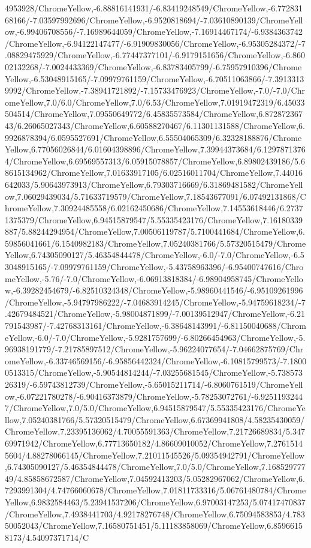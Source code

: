 {\begin{tikzternal}
{4953928/ChromeYellow,-6.88816141931/-6.83419248549/ChromeYellow,-6.77283168166/-7.03597992696/ChromeYellow,-6.9520818694/-7.03610890139/ChromeYellow,-6.99406708556/-7.16989644059/ChromeYellow,-7.16914467174/-6.9384363742/ChromeYellow,-6.94122147477/-6.91909830056/ChromeYellow,-6.95305284372/-7.08829475929/ChromeYellow,-6.77447377101/-6.9179151656/ChromeYellow,-6.86002132268/-7.0024433369/ChromeYellow,-6.83783405799/-6.75957910396/ChromeYellow,-6.53048915165/-7.09979761159/ChromeYellow,-6.70511063866/-7.39133139992/ChromeYellow,-7.38941721892/-7.15733476923/ChromeYellow,-7.0/-7.0/ChromeYellow,7.0/6.0/ChromeYellow,7.0/6.53/ChromeYellow,7.01919472319/6.45033504514/ChromeYellow,7.09550649772/6.45835573584/ChromeYellow,6.87287236743/6.26065027343/ChromeYellow,6.60588270467/6.11301131588/ChromeYellow,6.9926878394/6.0595527691/ChromeYellow,6.55504065309/6.32328188876/ChromeYellow,6.77056026844/6.01604398896/ChromeYellow,7.39944373684/6.12978713764/ChromeYellow,6.69569557313/6.05915078857/ChromeYellow,6.89802439186/5.68615134962/ChromeYellow,7.01633917105/6.02516011704/ChromeYellow,7.44016642033/5.90643973913/ChromeYellow,6.79303716669/6.31869481582/ChromeYellow,7.06029439034/5.71633719579/ChromeYellow,7.18543677091/6.07492131868/ChromeYellow,7.30924485558/6.02162450686/ChromeYellow,7.14553618446/6.27371375379/ChromeYellow,6.94515879547/5.55335423176/ChromeYellow,7.16180339887/5.88244294954/ChromeYellow,7.00506119787/5.7100441684/ChromeYellow,6.59856041661/6.1540982183/ChromeYellow,7.05240381766/5.57320515479/ChromeYellow,6.74305090127/5.46354844478/ChromeYellow,-6.0/-7.0/ChromeYellow,-6.53048915165/-7.09979761159/ChromeYellow,-5.43758963396/-6.95400747616/ChromeYellow,-5.76/-7.0/ChromeYellow,-6.06913818384/-6.98904958745/ChromeYellow,-6.39282454679/-6.82510324348/ChromeYellow,-5.98960441546/-6.95109261996/ChromeYellow,-5.94797986222/-7.04683914245/ChromeYellow,-5.94759618234/-7.42679484521/ChromeYellow,-5.98004871899/-7.00139512947/ChromeYellow,-6.21791543987/-7.42768313161/ChromeYellow,-6.38648143991/-6.81150040688/ChromeYellow,-6.0/-7.0/ChromeYellow,-5.9281757699/-6.80266454963/ChromeYellow,-5.96938191779/-7.21785897512/ChromeYellow,-5.96224077654/-7.04662875769/ChromeYellow,-6.33746569156/-6.95856442324/ChromeYellow,-6.10815799573/-7.18000513315/ChromeYellow,-5.90544814244/-7.03255681545/ChromeYellow,-5.73857326319/-6.59743812739/ChromeYellow,-5.65015211714/-6.8060761519/ChromeYellow,-6.07221780278/-6.90416373879/ChromeYellow,-5.78253072761/-6.92511932447/ChromeYellow,7.0/5.0/ChromeYellow,6.94515879547/5.55335423176/ChromeYellow,7.05240381766/5.57320515479/ChromeYellow,6.67369941808/4.58235430059/ChromeYellow,7.23395136062/4.70055591363/ChromeYellow,7.21726689834/5.34769971942/ChromeYellow,6.77713650182/4.86609010052/ChromeYellow,7.27615145604/4.88278066145/ChromeYellow,7.21011545526/5.09354942791/ChromeYellow,6.74305090127/5.46354844478/ChromeYellow,7.0/5.0/ChromeYellow,7.16852977749/4.85858672587/ChromeYellow,7.04592413203/5.05282967062/ChromeYellow,6.7293991304/4.74766060678/ChromeYellow,7.01811733316/5.06761480784/ChromeYellow,6.9832584463/5.23941537206/ChromeYellow,6.97003147253/5.07417470837/ChromeYellow,7.4938441703/4.92178276748/ChromeYellow,6.75094583853/4.78350052043/ChromeYellow,7.16580751451/5.11183858069/ChromeYellow,6.85966158173/4.54097371714/C}
\end{tikzternal}}
